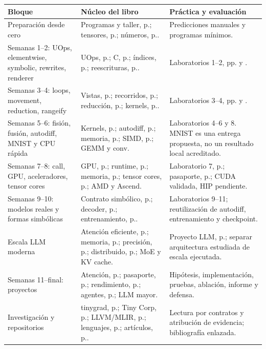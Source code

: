\documentclass[12pt,a4paper,oneside]{report}
\begin{document}
\begin{longtable}{@{}P{.22\textwidth}P{.43\textwidth}P{.29\textwidth}@{}}
\toprule\textbf{Bloque} & \textbf{Núcleo del libro} & \textbf{Práctica y evaluación}\\\midrule\endhead
Preparación desde cero & Programas y taller, p.\pageref{ch:programa}; tensores, p.\pageref{ch:tensores}; números, p.\pageref{ch:numeros}. & Predicciones manuales y programas mínimos.\\
Semanas 1--2: UOps, elementwise, symbolic, rewrites, renderer & UOps, p.\pageref{ch:uops}; C, p.\pageref{ch:renderer}; índices, p.\pageref{ch:symbolic}; reescrituras, p.\pageref{ch:rewrites}. & Laboratorios 1--2, pp.\pageref{lab:uno} y \pageref{lab:dos}.\\
Semanas 3--4: loops, movement, reduction, rangeify & Vistas, p.\pageref{ch:movement}; recorridos, p.\pageref{ch:rangeify}; reducción, p.\pageref{ch:reducciones}; kernels, p.\pageref{ch:schedule}. & Laboratorios 3--4, pp.\pageref{lab:tres} y \pageref{lab:cuatro}.\\
Semanas 5--6: fisión, fusión, autodiff, MNIST y CPU rápida & Kernels, p.\pageref{ch:schedule}; autodiff, p.\pageref{ch:autodiff}; memoria, p.\pageref{ch:jerarquia}; SIMD, p.\pageref{ch:simd}; GEMM y conv. & Laboratorios 4--6 y 8. MNIST es una entrega propuesta, no un resultado local acreditado.\\
Semanas 7--8: call, GPU, aceleradores, tensor cores & GPU, p.\pageref{ch:gpu}; runtime, p.\pageref{ch:runtime}; memoria, p.\pageref{ch:gpu_memoria}; tensor cores, p.\pageref{ch:tensorcores}; AMD y Ascend. & Laboratorio 7, p.\pageref{lab:siete}; pasaporte, p.\pageref{project:pasaporte}; CUDA validada, HIP pendiente.\\
Semanas 9--10: modelos reales y formas simbólicas & Contrato simbólico, p.\pageref{curso:rangeify}; decoder, p.\pageref{ch:decoder-completo}; entrenamiento, p.\pageref{ch:train}. & Laboratorios 9--11; reutilización de autodiff, entrenamiento y checkpoint.\\
Escala LLM moderna & Atención eficiente, p.\pageref{ch:flash}; memoria, p.\pageref{ch:escalar}; precisión, p.\pageref{ch:precision-mixta}; distribuido, p.\pageref{ch:distribuido}; MoE y KV cache. & Proyecto LLM, p.\pageref{project:llm}; separar arquitectura estudiada de escala ejecutada.\\
Semanas 11--final: proyectos & Atención, p.\pageref{project:atencion}; pasaporte, p.\pageref{project:pasaporte}; rendimiento, p.\pageref{project:competitivo}; agentes, p.\pageref{project:agente}; LLM mayor. & Hipótesis, implementación, pruebas, ablación, informe y defensa.\\
Investigación y repositorios & tinygrad, p.\pageref{ch:atlas-tinygrad}; Tiny Corp, p.\pageref{ch:tinycorp-sistemas}; LLVM/MLIR, p.\pageref{ch:ssa-mlir}; lenguajes, p.\pageref{ch:atlas-lenguajes}; artículos, p.\pageref{ch:articulos-2026}. & Lectura por contratos y atribución de evidencia; bibliografía enlazada.\\
\bottomrule\end{longtable}
\end{document}
